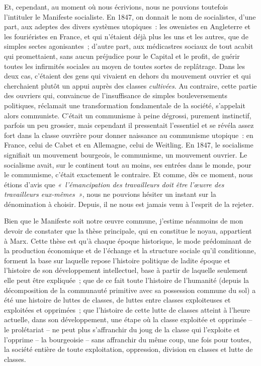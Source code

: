 \documentclass[french,twoside]{book} %
\begin{document}
Et, cependant, au moment où nous écrivions, nous ne pouvions toutefois l’intituler le Manifeste socialiste. En 1847, on donnait le nom de socialistes, d’une part, aux adeptes des divers systèmes utopiques : les owenistes en Angleterre et les fouriéristes en France, et qui n’étaient déjà plus les uns et les autres, que de simples sectes agonisantes ; d’autre part, aux médicastres sociaux de tout acabit qui promettaient, sans aucun préjudice pour le Capital et le profit, de guérir toutes les infirmités sociales au moyen de toutes sortes de replâtrage. Dans les deux cas, c’étaient des gens qui vivaient en dehors du mouvement ouvrier et qui cherchaient plutôt un appui auprès des classes \emph{cultivées}. Au contraire, cette partie des ouvriers qui, convaincue de l’insuffisance de simples bouleversements politiques, réclamait une transformation fondamentale de la société, s’appelait alors communiste. C'était un communisme à peine dégrossi, purement instinctif, parfois un peu grossier, mais cependant il pressentait l’essentiel et se révéla assez fort dans la classe ouvrière pour donner naissance au communisme utopique : en France, celui de Cabet et en Allemagne, celui de Weitling. En 1847, le socialisme signifiait un mouvement bourgeois, le communisme, un mouvement ouvrier. Le socialisme avait, sur le continent tout au moins, ses entrées dans le monde, pour le communisme, c’était exactement le contraire. Et comme, dès ce moment, nous étions d’avis que \emph{« l’émancipation des travailleurs doit être l’œuvre des travailleurs eux-mêmes »}, nous ne pouvions hésiter un instant sur la dénomination à choisir. Depuis, il ne nous est jamais venu à l’esprit de la rejeter.\par
Bien que le Manifeste soit notre œuvre commune, j’estime néanmoins de mon devoir de constater que la thèse principale, qui en constitue le noyau, appartient à Marx. Cette thèse est qu’à chaque époque historique, le mode prédominant de la production économique et de l’échange et la structure sociale qu’il conditionne, forment la base sur laquelle repose l’histoire politique de ladite époque et l’histoire de son développement intellectuel, base à partir de laquelle seulement elle peut être expliquée ; que de ce fait toute l’histoire de l’humanité (depuis la décomposition de la communauté primitive avec sa possession commune du sol) a été une histoire de luttes de classes, de luttes entre classes exploiteuses et exploitées et opprimées ; que l’histoire de cette lutte de classes atteint à l’heure actuelle, dans son développement, une étape où la classe exploitée et opprimée – le prolétariat – ne peut plus s’affranchir du joug de la classe qui l’exploite et l’opprime – la bourgeoisie – sans affranchir du même coup, une fois pour toutes, la société entière de toute exploitation, oppression, division en classes et lutte de classes.\par
\end{document}
